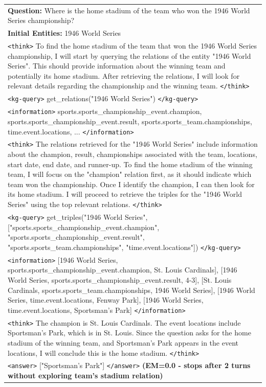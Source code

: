 {\scriptsize
\setlength{\arrayrulewidth}{0.3pt}
\setlength{\tabcolsep}{8pt}
\renewcommand{\arraystretch}{1.3}
\begin{longtable}{>{\raggedright\arraybackslash}p{}}
\toprule
\rowcolor{gray!20}
\textbf{Question:} Where is the home stadium of the team who won the 1946 World Series championship? \\
\rowcolor{gray!20}
\textbf{Initial Entities:} 1946 World Series \\
\midrule
\rowcolor{blue!10}
\texttt{<think>} To find the home stadium of the team that won the 1946 World Series championship, I will start by querying the relations of the entity "1946 World Series". This should provide information about the winning team and potentially its home stadium. After retrieving the relations, I will look for relevant details regarding the championship and the winning team. \texttt{</think>} \\
\rowcolor{green!10}
\texttt{<kg-query>} get\_relations("1946 World Series") \texttt{</kg-query>} \\
\rowcolor{yellow!10}
\texttt{<information>} sports.sports\_championship\_event.champion, sports.sports\_championship\_event.result, sports.sports\_team.championships, time.event.locations, ... \texttt{</information>} \\
\rowcolor{blue!10}
\texttt{<think>} The relations retrieved for the "1946 World Series" include information about the champion, result, championships associated with the team, locations, start date, end date, and runner-up. To find the home stadium of the winning team, I will focus on the "champion" relation first, as it should indicate which team won the championship. Once I identify the champion, I can then look for its home stadium. I will proceed to retrieve the triples for the "1946 World Series" using the top relevant relations. \texttt{</think>} \\
\rowcolor{green!10}
\texttt{<kg-query>} get\_triples("1946 World Series", ["sports.sports\_championship\_event.champion", "sports.sports\_championship\_event.result", "sports.sports\_team.championships", "time.event.locations"]) \texttt{</kg-query>} \\
\rowcolor{yellow!10}
\texttt{<information>} [1946 World Series, sports.sports\_championship\_event.champion, St. Louis Cardinals], [1946 World Series, sports.sports\_championship\_event.result, 4-3], [St. Louis Cardinals, sports.sports\_team.championships, 1946 World Series], [1946 World Series, time.event.locations, Fenway Park], [1946 World Series, time.event.locations, Sportsman's Park] \texttt{</information>} \\
\rowcolor{blue!10}
\texttt{<think>} The champion is St. Louis Cardinals. The event locations include Sportsman's Park, which is in St. Louis. Since the question asks for the home stadium of the winning team, and Sportsman's Park appears in the event locations, I will conclude this is the home stadium. \texttt{</think>} \\
\rowcolor{red!10}
\texttt{<answer>} ["Sportsman's Park"] \texttt{</answer>} \textbf{(EM=0.0 - stops after 2 turns without exploring team's stadium relation)} \\
\bottomrule
\end{longtable}
}


